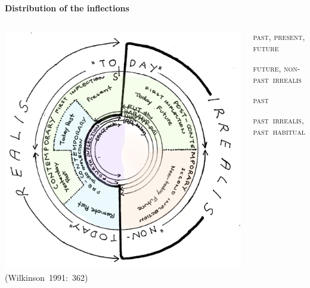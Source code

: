 \documentclass[dvipsnames]{beamer}%
\newcommand{\I}{\textbf{\textcolor{forest}{I}}}
\newcommand{\II}{\textbf{\textcolor{ochre}{II}}}
\newcommand{\III}{\textbf{\textcolor{blue}{III}}}
\newcommand{\IV}{\textbf{\textcolor{violet}{IV}}}
\begin{document}
\begin{frame}{\textbf{Distribution of the inflections}}
	\begin{columns}
		 \includegraphics[scale=.2]{../prospectus/WilkinsonDiagram362Col}\scriptsize{(Wilkinson~1991:~362)}
		\begin{description}
			\item<1->[\I] \textsc{past}, \textsc{present}, \textsc{future}
			\item<2->[\II] \textsc{future}, \textsc{non-past~irrealis}
			\item<3->[\III] \textsc{past}
			\item<4->[\IV] \textsc{past~irrealis, past~habitual}
			\item<5->[$ \star $]  {\color{gray}{here we go...}}
		\end{description}

	\end{columns}
\end{frame}%
\end{document}

